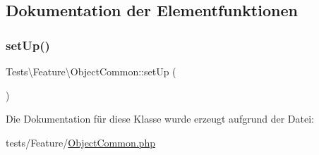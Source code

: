 \subsection{Dokumentation der Elementfunktionen}
\mbox{\label{classTests_1_1Feature_1_1ObjectCommon_ae6c07b20d8690a20c0e4da7116798561}} 
\subsubsection{\texorpdfstring{set\+Up()}{setUp()}}
{\footnotesize\ttfamily Tests\textbackslash{}\+Feature\textbackslash{}\+Object\+Common\+::set\+Up (\begin{DoxyParamCaption}{ }\end{DoxyParamCaption})\hspace{0.3cm}{\ttfamily [protected]}}



Die Dokumentation für diese Klasse wurde erzeugt aufgrund der Datei\+:\begin{DoxyCompactItemize}
\item 
tests/\+Feature/\hyperlink{ObjectCommon_8php}{Object\+Common.\+php}\end{DoxyCompactItemize}
